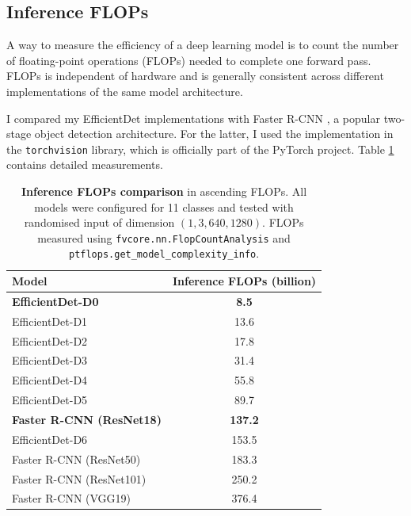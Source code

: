 \documentclass[12pt,a4paper,twoside,openany]{report}
\begin{document}
\subsection{Inference FLOPs}
A way to measure the efficiency of a deep learning model is to count the number of floating-point operations (FLOPs) needed to complete one forward pass. FLOPs is independent of hardware and is generally consistent across different implementations of the same model architecture.

I compared my EfficientDet implementations with Faster R-CNN \cite{ren_faster_2016}, a popular two-stage object detection architecture. For the latter, I used the implementation in the \verb|torchvision| library, which is officially part of the PyTorch project. Table \ref{table:flops} contains detailed measurements. 

\begin{table}[H]
    \centering
    \begin{tabular}{|l c|}
        \hline
        \textbf{Model}  &  \textbf{Inference FLOPs (billion)} \\
        \hline
        \textbf{EfficientDet-D0} & \textbf{8.5}\\
        EfficientDet-D1 & 13.6\\
        EfficientDet-D2 & 17.8\\
        EfficientDet-D3 & 31.4\\
        EfficientDet-D4 & 55.8\\
        EfficientDet-D5 & 89.7\\
        \textbf{Faster R-CNN (ResNet18)} & \textbf{137.2}\\
        EfficientDet-D6 & 153.5\\
        Faster R-CNN (ResNet50) & 183.3\\
        Faster R-CNN (ResNet101) & 250.2\\
        Faster R-CNN (VGG19) & 376.4\\
        \hline
    \end{tabular}
    \cprotect\caption{\textbf{Inference FLOPs comparison} in ascending FLOPs. All models were configured for 11 classes and tested with randomised input of dimension $(1, 3, 640, 1280)$. FLOPs measured using \verb|fvcore.nn.FlopCountAnalysis| and \verb|ptflops.get_model_complexity_info|.}
    \label{table:flops}
\end{table}
\end{document}
